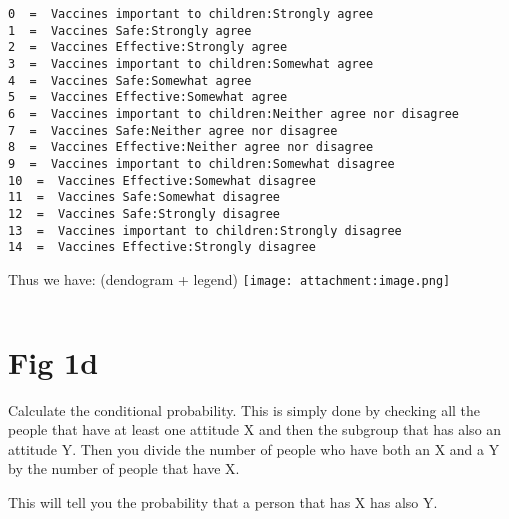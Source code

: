 \documentclass[11pt]{article}
\makeatletter
\newcommand{\boxspacing}{\kern\kvtcb@left@rule\kern\kvtcb@boxsep}
\newcommand{\prompt}[4]{
        {\ttfamily\llap{{\color{#2}[#3]:\hspace{3pt}#4}}\vspace{-\baselineskip}}
    }
\makeatother
\begin{document}
    \begin{Verbatim}[commandchars=\\\{\}]
0  =  Vaccines important to children:Strongly agree
1  =  Vaccines Safe:Strongly agree
2  =  Vaccines Effective:Strongly agree
3  =  Vaccines important to children:Somewhat agree
4  =  Vaccines Safe:Somewhat agree
5  =  Vaccines Effective:Somewhat agree
6  =  Vaccines important to children:Neither agree nor disagree
7  =  Vaccines Safe:Neither agree nor disagree
8  =  Vaccines Effective:Neither agree nor disagree
9  =  Vaccines important to children:Somewhat disagree
10  =  Vaccines Effective:Somewhat disagree
11  =  Vaccines Safe:Somewhat disagree
12  =  Vaccines Safe:Strongly disagree
13  =  Vaccines important to children:Strongly disagree
14  =  Vaccines Effective:Strongly disagree
    \end{Verbatim}

    Thus we have: (dendogram + legend)
\texttt{[image: attachment:image.png]}

    \begin{tcolorbox}[breakable, size=fbox, boxrule=1pt, pad at break*=1mm,colback=cellbackground, colframe=cellborder]
\prompt{In}{incolor}{ }{\boxspacing}
\begin{Verbatim}[commandchars=\\\{\}]

\end{Verbatim}
\end{tcolorbox}

    \hypertarget{fig-1d}{%
\section{Fig 1d}\label{fig-1d}}

    Calculate the conditional probability. This is simply done by checking
all the people that have at least one attitude X and then the subgroup
that has also an attitude Y. Then you divide the number of people who
have both an X and a Y by the number of people that have X.

This will tell you the probability that a person that has X has also Y.
\end{document}
